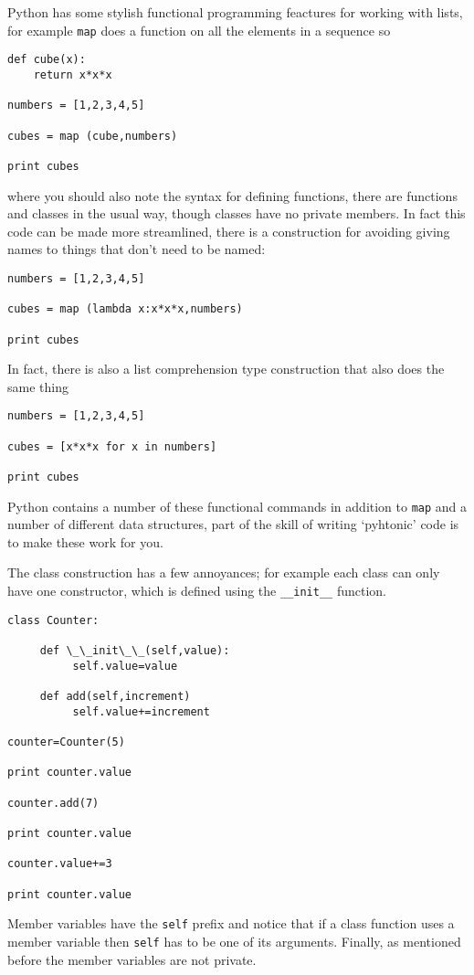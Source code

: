 \documentclass[11pt,a4paper]{scrartcl}
\begin{document}
Python has some stylish functional programming feactures for working
with lists, for example \texttt{map} does a function on all the
elements in a sequence so
\begin{lstlisting}[numbers=right]
def cube(x):
    return x*x*x

numbers = [1,2,3,4,5]

cubes = map (cube,numbers)

print cubes
\end{lstlisting}
where you should also note the syntax for defining functions, there
are functions and classes in the usual way, though classes have no
private members. In fact this code can be made more streamlined, there
is a construction for avoiding giving names to things that don't need
to be named:
\begin{lstlisting}[numbers=right]
numbers = [1,2,3,4,5]

cubes = map (lambda x:x*x*x,numbers)

print cubes
\end{lstlisting}
In fact, there is also a list comprehension type construction that also does the same thing
\begin{lstlisting}[numbers=right]
numbers = [1,2,3,4,5]

cubes = [x*x*x for x in numbers]

print cubes
\end{lstlisting}

Python contains a number of these functional commands in addition to
\texttt{map} and a number of different data structures, part of the
skill of writing \lq{}pyhtonic\rq{} code is to make these work for
you.

The class construction has a few annoyances; for example each class
can only have one constructor, which is defined using the
\texttt{\_\_init\_\_} function.
\begin{lstlisting}[numbers=right]
class Counter:

     def \_\_init\_\_(self,value):
          self.value=value

     def add(self,increment)
          self.value+=increment

counter=Counter(5)

print counter.value

counter.add(7)

print counter.value

counter.value+=3

print counter.value

\end{lstlisting}
Member variables have the \texttt{self} prefix and notice that if a
class function uses a member variable then \texttt{self} has to be one
of its arguments. Finally, as mentioned before the member variables
are not private.
\end{document}
